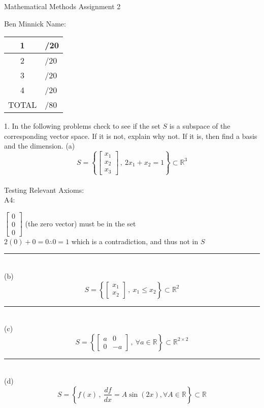 \documentclass[12pt]{article}
\newcommand{\pagebar}{
  \noindent\rule{\textwidth}{1pt}\\
}
\begin{document}
 Mathematical Methods Assignment 2

\vspace{1cm}

\noindent Ben Minnick \hfill Name: 

\vspace{1cm}

\begin{center}
\Large %
\begin{tabular}{|c|>{\raggedleft\arraybackslash}p{2cm}|} %
\hline
\rule{0pt}{1.2em} 1 & /20 \\ %
\hline
\rule{0pt}{1.2em} 2 & /20 \\
\hline
\rule{0pt}{1.2em} 3 & /20 \\
\hline
\rule{0pt}{1.2em} 4 & /20 \\
\hline
\rule{0pt}{1.2em} TOTAL & /80 \\
\hline
\end{tabular}
\end{center}

\newpage

1. In the following problems check to see if the set $S$ is a subspace of the corresponding
vector space. If it is not, explain why not. If it is, then find a basis and the dimension.
(a)
$$
S = \left\{ \begin{bmatrix} x_1 \\ x_2 \\ x_3 \end{bmatrix} \, , \ 2x_1 + x_2 = 1 \right\} \subset \mathbb{R}^3
$$
\\
Testing Relevant Axioms:\\
A4:
\begin{center}
  $\begin{bmatrix}
    0\\0\\0
  \end{bmatrix}$ (the zero vector) must be in the set\\
  $2(0) + 0 = 0 \therefore 0 = 1$ which is a contradiction, and thus not in $S$ 
\end{center}
\pagebar
(b)
$$
S = \left\{ \begin{bmatrix} x_1 \\ x_2 \end{bmatrix} \, , \ x_1 \leq x_2 \right\} \subset \mathbb{R}^2
$$
\pagebar
(c)
$$
S = \left\{ \begin{bmatrix} a & 0 \\ 0 & -a \end{bmatrix} \, , \ \forall a \in \mathbb{R} \right\} \subset \mathbb{R}^{2 \times 2}
$$
\pagebar
(d)
$$
S = \left\{ f(x) \, , \ \frac{df}{dx} = A\sin(2x), \forall A \in \mathbb{R} \right\} \subset \mathbb{R}
$$
\end{document}
